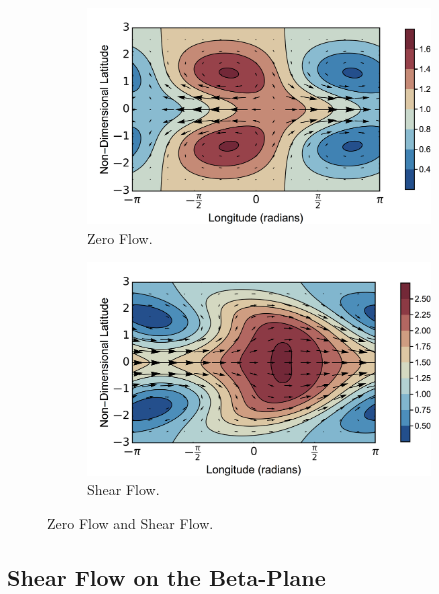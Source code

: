 \begin{figure}
  \begin{subfigure}[b]{0.4\textwidth}
    \includegraphics[width=\textwidth]{figures/wave-mean-flow/ps-no-flow.png}
    \caption{Zero Flow.}
    \label{fig:ps-no-flow}
  \end{subfigure}
  \begin{subfigure}[b]{0.4\textwidth}
    \includegraphics[width=\textwidth]{figures/wave-mean-flow/ps-shear-flow.png}
    \caption{Shear Flow.}
    \label{fig:ps-shear-flow}
  \end{subfigure}
  \caption{Zero Flow and Shear Flow.}
  \label{fig:ps-flow}
\end{figure}


\subsection*{Shear Flow on the Beta-Plane}

